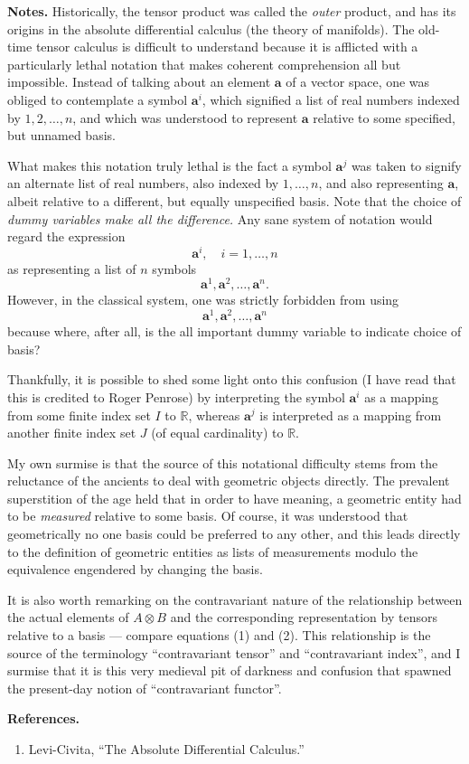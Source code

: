 \documentclass{article}
\newcommand{\reals}{\mathbb{R}}
\newcommand{\va}{\mathbf{a}}
\begin{document}
{\bf Notes.} Historically, the tensor product was called the {\em
  outer} product, and has its origins in the absolute differential
calculus (the theory of manifolds).  The old-time tensor calculus is
difficult to understand because it is afflicted with a particularly
lethal notation that makes coherent comprehension all but impossible.
Instead of talking about an element $\va$ of a vector space, one was
obliged to contemplate a symbol $\va^i$, which signified a list of
real numbers indexed by $1,2,\ldots,n$, and which was understood to
represent $\va$ relative to some specified, but unnamed basis.  

What makes this notation truly lethal is the fact a symbol $\va^j$ was
taken to signify an alternate list of real numbers, also indexed by
$1,\ldots, n$, and also representing $\va$, albeit relative to a
different, but equally unspecified basis.  Note that the choice of
{\em dummy variables make all the difference.}  Any sane system of
notation would regard the expression
$$\va^i,\quad i=1,\ldots,n$$
as representing a list of $n$ symbols
$$\va^1,\va^2,\ldots,\va^n.$$
However, in the classical system, one was strictly forbidden from
using
$$\va^1,\va^2,\ldots,\va^n$$
because where, after all, is the all important
dummy variable to indicate choice of basis?

Thankfully, it is possible to shed some light onto this confusion (I
have read that this is credited to Roger Penrose) by interpreting the
symbol $\va^i$ as a mapping from some finite index set $I$ to
$\reals$, whereas $\va^j$ is interpreted as a mapping from another
finite index set $J$ (of equal cardinality) to $\reals$.  


My own surmise is that the source of this notational difficulty stems
from the reluctance of the ancients to deal with geometric objects
directly.  The prevalent superstition of the age held that in order to
have meaning, a geometric entity had to be {\em measured} relative to
some basis.  Of course, it was understood that geometrically no one
basis could be preferred to any other, and this leads directly to the
definition of geometric entities as lists of measurements modulo the
equivalence engendered by changing the basis.

It is also worth remarking on the contravariant nature of the
relationship between the actual elements of $A\otimes B$ and the
corresponding representation by tensors relative to a basis --- compare
equations (1) and (2).
This relationship is the source of the
terminology ``contravariant tensor'' and ``contravariant index'', and
I surmise that  it
is this very medieval pit of darkness and confusion that spawned the
present-day notion of ``contravariant functor''.
\bigskip

{\bf References.}
\begin{enumerate}
\item Levi-Civita, ``The Absolute Differential Calculus.''
\end{enumerate}
\end{document}
